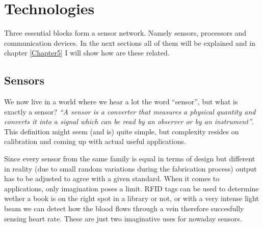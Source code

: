 
\chapter{Technologies} %

\label{Chapter3} %




Three essential blocks form a sensor network. Namely sensors, processors and communication devices\citep{chong2003sensor}. In the next sections all of them will be explained and in chapter \ref{Chapter5} I will show how are these related.



\section{Sensors}

We now live in a world where we hear a lot the word ``sensor'', but what is exactly a sensor? \emph{``A sensor is a converter that measures a physical quantity and converts it into a signal which can be read by an observer or by an instrument''}\citep{WikiSensor}. This definition might seem (and is) quite simple, but complexity resides on calibration and coming up with actual useful applications. 

Since every sensor from the same family is equal in terms of design but different in reality (due to small random variations during the fabrication process) output has to be adjusted to agree with a given standard. When it comes to applications, only imagination poses a limit. RFID tags can be used to determine wether a book is on the right spot in a library or not, or with a very intense light beam we can detect how the blood flows through a vein therefore succesfully sensing heart rate. These are just two imaginative uses for nowaday sensors.

